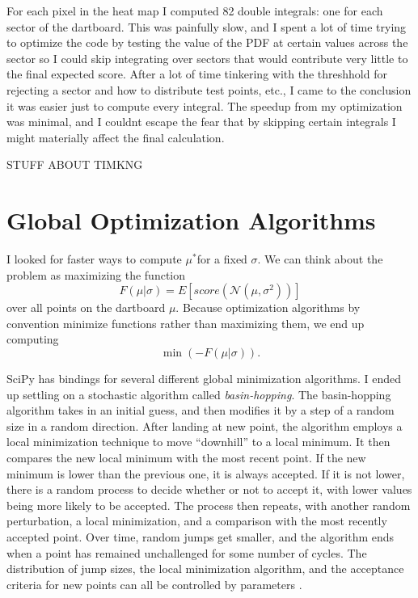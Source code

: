 \documentclass[]{article}
\newcommand{\mustar}{\ensuremath{\mu^* }}
\begin{document}
For each pixel in the heat map I computed 82 double integrals: one for each sector of the dartboard. This was painfully slow, and I spent a lot of time trying to optimize the code by testing the value of the PDF at certain values across the sector so I could skip integrating over sectors that would contribute very little to the final expected score. After a lot of time tinkering with the threshhold for rejecting a sector and how to distribute test points, etc., I came to the conclusion it was easier just to compute every integral. The speedup from my optimization was minimal, and I couldnt escape the fear that by skipping certain integrals I might materially affect the final calculation.

STUFF ABOUT TIMKNG

\section{Global Optimization Algorithms}

I looked for faster ways to compute  \mustar for a fixed $\sigma$. We can think about the problem as maximizing the function
\begin{equation}
	F(\mu \vert \sigma)  = E[score(\mathcal{N}(\mu, \sigma^2))]
\end{equation}
over all points  on the dartboard $\mu$. Because optimization algorithms by convention minimize functions rather than maximizing them, we end up computing 
\begin{equation}
	\min(-F(\mu \vert \sigma)).
\end{equation}

SciPy has bindings for several different global minimization algorithms. I ended up settling on a stochastic algorithm called \textit{basin-hopping}. The basin-hopping algorithm takes in an initial guess, and then modifies it by a step of a random size in a random direction. After landing at new point, the algorithm employs a local minimization technique to move ``downhill'' to a local minimum. It then compares the new local minimum with the most recent point. If the new minimum is lower than the previous one, it is always accepted. If it is not lower, there is a random process to decide whether or not to accept it, with lower values being more likely to be accepted. The process then repeats, with another random perturbation, a local minimization, and a comparison with the most recently accepted point. Over time, random jumps get smaller, and the algorithm ends when a point has remained unchallenged for some number of cycles. The distribution of jump sizes, the local minimization algorithm, and the acceptance criteria for new points can all be controlled by parameters \cite{basin}. 
\end{document}
